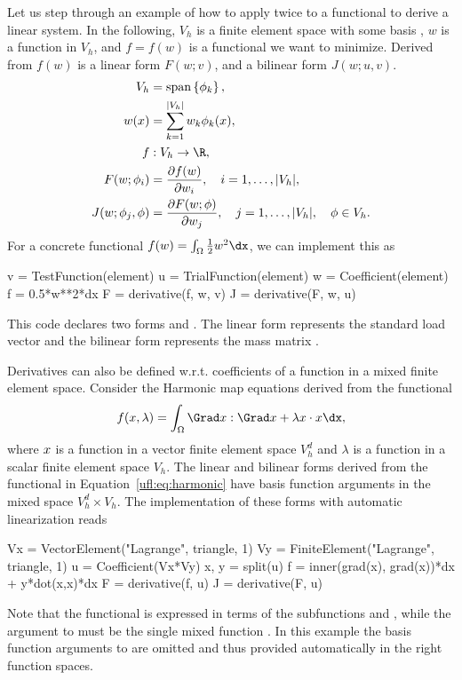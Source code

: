 Let us step through an example of how to apply  twice
to a functional to derive a linear system.  In the following, $V_h$
is a finite element space with some basis , $w$ is a function in $V_h$,
and $f = f(w)$ is a functional we want to minimize. Derived from $f(w)$
is a linear form $F(w; v)$, and a bilinear form $J(w; u, v)$.\vspace*{-3pt}
\begin{align}
V_h &= \spans{ \phi_k }, \\
w(x) &= \sum_{k=1}^{|V_h|} w_k \phi_k(x), \\
f&: V_h \rightarrow \R, \\
F(w; \phi_i) &= \frac{\partial f(w)}{\partial w_i},
  \quad i=1,\ldots,|V_h|, \\
J(w; \phi_j, \phi) &= \frac{\partial F(w; \phi)}{\partial w_j},
  \quad j=1,\ldots,|V_h|, \quad \phi\in V_h.\vspace*{-3pt}
\end{align}
For a concrete functional $f(w) = \int_\Omega \frac 1 2 w^2 \dx$, we
can implement this as\vspace*{-3pt}
\begin{uflcode}
v = TestFunction(element)
u = TrialFunction(element)
w = Coefficient(element)
f = 0.5*w**2*dx
F = derivative(f, w, v)
J = derivative(F, w, u)
\end{uflcode}
This code declares two forms  and .  The linear form 
represents the standard load vector  and the bilinear form
 represents the mass matrix .

Derivatives can also be defined w.r.t. coefficients of a function in a
mixed finite element space.  Consider the Harmonic map equations derived
from the functional\vspace*{-3pt}
\begin{align} \label{ufl:eq:harmonic}
f(\xx, \lambda) = \int_\Omega \Grad \xx : \Grad \xx + \lambda \xx\cdot\xx \dx,\vspace*{-3pt}
\end{align}
where ${x}$ is a function in a vector finite element space $V_h^d$
and $\lambda$ is a function in a scalar finite element space
$V_h$.  The linear and bilinear forms derived from the functional in
Equation~\ref{ufl:eq:harmonic} have basis function arguments in the mixed
space $V_h^d \times V_h$. The implementation of these forms with automatic
linearization reads\vspace*{-3pt}
\begin{uflcode}
Vx = VectorElement("Lagrange", triangle, 1)
Vy = FiniteElement("Lagrange", triangle, 1)
u = Coefficient(Vx*Vy)
x, y = split(u)
f = inner(grad(x), grad(x))*dx + y*dot(x,x)*dx
F = derivative(f, u)
J = derivative(F, u)
\end{uflcode}
Note that the functional is expressed in terms of the subfunctions 
and , while the argument to  must be the single
mixed function .  In this example the basis function arguments
to  are omitted and thus provided automatically in the
right function spaces.

